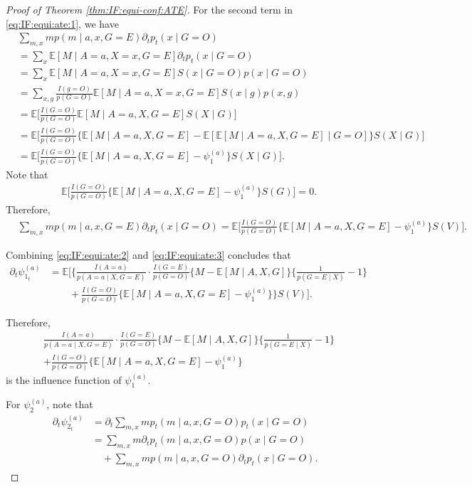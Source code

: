 \documentclass[10pt]{article}
\newcommand{\E}{\mathbb{E}}
\begin{document}
\begin{proof}[Proof of Theorem \ref{thm:IF:equi-conf:ATE}]
For the second term in \eqref{eq:IF:equi:ate:1}, we have
\begin{align*}
&\sum_{m,x} m p(m\mid a,x,G=E)\partial_t p_t(x\mid G=O)\\
&=\sum_{x} \E[M\mid A=a,X=x,G=E]\partial_t p_t(x\mid G=O)\\
&=\sum_{x} \E[M\mid A=a,X=x,G=E] S(x\mid G=O)p(x\mid G=O)\\
&=\sum_{x,g}\frac{I(g=O)}{p(G=O)}\E[M\mid A=a,X=x,G=E]S(x\mid g)p(x,g)\\
&=\E\Big[\frac{I(G=O)}{p(G=O)}\E[M\mid A=a,X,G=E]S(X\mid G)\Big]\\
&=\E\Big[\frac{I(G=O)}{p(G=O)}\{\E[M\mid A=a,X,G=E]-\E[\E[M\mid A=a,X,G=E]\mid G=O]\}S(X\mid G)\Big]\\
&=\E\Big[\frac{I(G=O)}{p(G=O)}\{\E[M\mid A=a,X,G=E]-\psi_1^{(a)}\}S(X\mid G)\Big].
\end{align*}
Note that
\begin{align*}
&\E\Big[\frac{I(G=O)}{p(G=O)}\{\E[M\mid A=a,X,G=E]-\psi_1^{(a)}\}S(G)\Big]=0.
\end{align*}
Therefore,
\begin{equation}
\label{eq:IF:equi:ate:3}
\begin{aligned}
&\sum_{m,x} m p(m\mid a,x,G=E)\partial_t p_t(x\mid G=O)
=\E\Big[\frac{I(G=O)}{p(G=O)}\{\E[M\mid A=a,X,G=E]-\psi_1^{(a)}\}S(V)\Big].
\end{aligned}
\end{equation}

Combining \eqref{eq:IF:equi:ate:2} and \eqref{eq:IF:equi:ate:3} concludes that
\begin{align*}
\partial_t\psi^{(a)}_{1_t} 
&=\E
\Big[\Big\{
\frac{I(A=a)}{p(A=a\mid X,G=E)}\cdot\frac{I(G=E)}{p(G=O)}
\{M-\E[M\mid A,X,G]\}\{\frac{1}{p(G=E\mid X)}-1\}\\
&\qquad+\frac{I(G=O)}{p(G=O)}\{\E[M\mid A=a,X,G=E]-\psi_1^{(a)}\}
\Big\}S(V)\Big].
\end{align*}

Therefore, 
\begin{align*}
&\frac{I(A=a)}{p(A=a\mid X,G=E)}\cdot\frac{I(G=E)}{p(G=O)}
\{M-\E[M\mid A,X,G]\}\{\frac{1}{p(G=E\mid X)}-1\}\\
&+\frac{I(G=O)}{p(G=O)}\{\E[M\mid A=a,X,G=E]-\psi_1^{(a)}\}
\end{align*}
is the influence function of $\psi_1^{(a)}$.



For $\psi_2^{(a)}$, note that
\begin{equation}
\label{eq:IF:equi:ate:4}
\begin{aligned}
\partial_t\psi^{(a)}_{2_t} 
&=\partial_t \sum_{m,x} mp_t(m\mid a,x,G=O)p_t(x\mid G=O)\\
&= \sum_{m,x} m\partial_t p_t(m\mid a,x,G=O)p(x\mid G=O)\\
&\quad+ \sum_{m,x} m p(m\mid a,x,G=O)\partial_t p_t(x\mid G=O).
\end{aligned}
\end{equation}


\end{proof}
\end{document}
